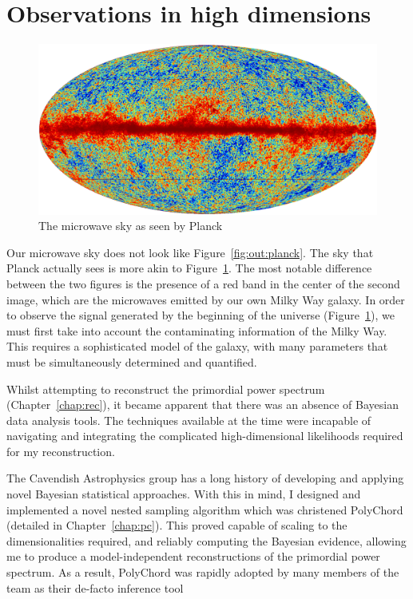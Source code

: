 \section{Observations in high dimensions}
\begin{figure}[tp]
  \includegraphics[width=\textwidth]{chapters/outline/figures/planck_galaxy}
  \caption{The microwave sky as seen by Planck}\label{fig:out:planck_galaxy}
\end{figure}
Our microwave sky does not look like Figure~\ref{fig:out:planck}. The sky that Planck actually sees is more akin to Figure~\ref{fig:out:planck_galaxy}. The most notable difference between the two figures is the presence of a red band in the center of the second image, which are the microwaves emitted by our own Milky Way galaxy. In order to observe the signal generated by the beginning of the universe (Figure~\ref{fig:out:planck_galaxy}), we must first take into account the contaminating information of the Milky Way. This requires a sophisticated model of the galaxy, with many parameters that must be simultaneously determined and quantified. 

Whilst attempting to reconstruct the primordial power spectrum (Chapter~\ref{chap:rec}), it became apparent that there was an absence of Bayesian data analysis tools. The techniques available at the time were incapable of navigating and integrating the complicated high-dimensional likelihoods required for my reconstruction.

The Cavendish Astrophysics group has a long history of developing and applying novel Bayesian statistical approaches. With this in mind, I designed and implemented a novel nested sampling algorithm which was christened PolyChord (detailed in Chapter~\ref{chap:pc}). This proved capable of scaling to the dimensionalities required, and reliably computing  the Bayesian evidence, allowing me to produce a model-independent reconstructions of the primordial power spectrum.
As a result, PolyChord was rapidly adopted by many members of the team as their de-facto inference tool

